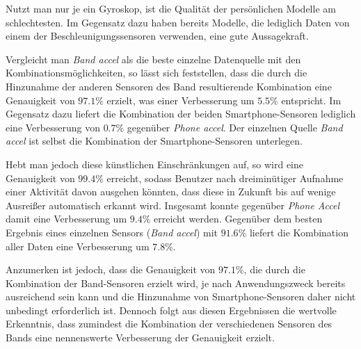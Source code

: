 Nutzt man nur je ein Gyroskop, ist die Qualität der persönlichen Modelle am schlechtesten. Im Gegensatz dazu haben bereits Modelle, die lediglich Daten von einem der Beschleunigungssensoren verwenden, eine gute Aussagekraft.

Vergleicht man \textit{Band accel} als die beste einzelne Datenquelle mit den Kombinationsmöglichkeiten, so lässt sich feststellen, dass die durch die Hinzunahme der anderen Sensoren des Band resultierende Kombination eine Genauigkeit von $97.1 \%$ erzielt, was einer Verbesserung um $5.5 \%$ entspricht. Im Gegensatz dazu liefert die Kombination der beiden Smartphone-Sensoren lediglich eine Verbesserung von $0.7 \%$ gegenüber \textit{Phone accel}. Der einzelnen Quelle \textit{Band accel} ist selbst die Kombination der Smartphone-Sensoren unterlegen.

Hebt man jedoch diese künstlichen Einschränkungen auf, so wird eine Genauigkeit von $99.4 \%$ erreicht, sodass Benutzer nach dreiminütiger Aufnahme einer Aktivität davon ausgehen könnten, dass diese in Zukunft bis auf wenige Ausreißer automatisch erkannt wird. Insgesamt konnte gegenüber \textit{Phone Accel} damit eine Verbesserung um $9.4 \%$ erreicht werden. Gegenüber dem besten Ergebnis eines einzelnen Sensors (\textit{Band accel}) mit $91.6 \%$ liefert die Kombination aller Daten eine Verbesserung um $7.8 \%$.

Anzumerken ist jedoch, dass die Genauigkeit von $97.1 \%$, die durch die Kombination der Band-Sensoren erzielt wird, je nach Anwendungszweck bereits ausreichend sein kann und die Hinzunahme von Smartphone-Sensoren daher nicht unbedingt erforderlich ist. Dennoch folgt aus diesen Ergebnissen die wertvolle Erkenntnis, dass zumindest die Kombination der verschiedenen Sensoren des Bands eine nennenswerte Verbesserung der Genauigkeit erzielt.

